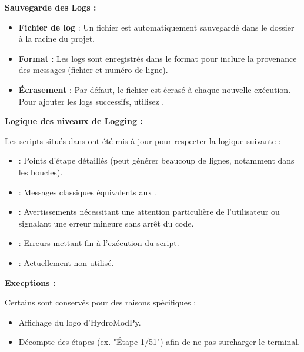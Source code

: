 \vspace{1em}

\noindent\textbf{Sauvegarde des Logs :}

\begin{itemize}[leftmargin=1.5cm]
    \item \textbf{Fichier de log} : Un fichier  est automatiquement sauvegardé dans le dossier  à la racine du projet.
    \item \textbf{Format} : Les logs sont enregistrés dans le format  pour inclure la provenance des messages (fichier et numéro de ligne).
    \item \textbf{Écrasement} : Par défaut, le fichier est écrasé à chaque nouvelle exécution. Pour ajouter les logs successifs, utilisez .
\end{itemize}

\vspace{1em}

\noindent\textbf{Logique des niveaux de Logging :}

Les scripts situés dans  ont été mis à jour pour respecter la logique suivante :
\begin{itemize}[leftmargin=1.5cm]
    \item {} : Points d'étape détaillés (peut générer beaucoup de lignes, notamment dans les boucles).
    \item {} : Messages classiques équivalents aux .
    \item {} : Avertissements nécessitant une attention particulière de l'utilisateur ou signalant une erreur mineure sans arrêt du code.
    \item {} : Erreurs mettant fin à l'exécution du script.
    \item {} : Actuellement non utilisé.
\end{itemize}

\vspace{1em}

\noindent\textbf{Execptions :}

Certains  sont conservés pour des raisons spécifiques :
\begin{itemize}[leftmargin=1.5cm]
    \item Affichage du logo d'HydroModPy.
    \item Décompte des étapes (ex. "Étape 1/51") afin de ne pas surcharger le terminal.
\end{itemize}

